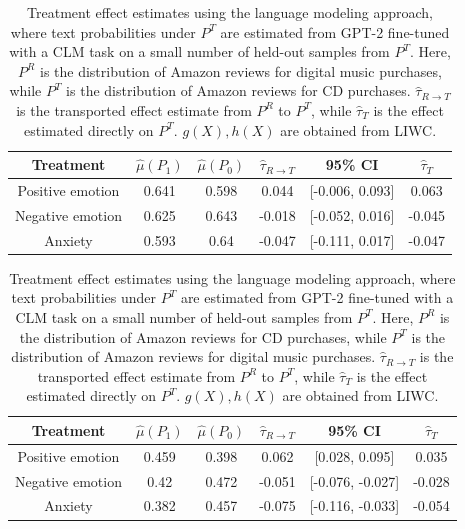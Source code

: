 \documentclass{article}
\begin{document}
\begin{table}[!ht]
    \centering
    \begin{tabular}{c|ccccc}
    \toprule
    Treatment & $\hat{\mu}(P_1)$ & $\hat{\mu}(P_0)$ & $\hat{\tau}_{R \rightarrow T}$ & 95\% CI & $\hat{\tau}_T$ \\
    \midrule
    Positive emotion & 0.641 & 0.598 &  0.044 & [-0.006, 0.093] & 0.063 \\
    Negative emotion & 0.625 & 0.643 & -0.018 & [-0.052, 0.016] & -0.045 \\
    Anxiety  & 0.593 & 0.64  & -0.047 & [-0.111, 0.017] & -0.047 \\
    \bottomrule
    \end{tabular}
    \caption{Treatment effect estimates using the language modeling approach, where text probabilities under $P^T$ are estimated from GPT-2 fine-tuned with a CLM task on a small number of held-out samples from $P^T$. Here, $P^R$ is the distribution of Amazon reviews for digital music purchases, while $P^T$ is the distribution of Amazon reviews for CD purchases. $\hat{\tau}_{R \rightarrow T}$ is the transported effect estimate from $P^R$ to $P^T$, while $\hat{\tau}_T$ is the effect estimated directly on $P^T$. $g(X), h(X)$ are obtained from LIWC.}
    \label{tab:results_clm_gpt2_finetuned_amazon1}
\end{table}

\begin{table}[!ht]
    \centering
    \begin{tabular}{c|ccccc}
    \toprule
    Treatment & $\hat{\mu}(P_1)$ & $\hat{\mu}(P_0)$ & $\hat{\tau}_{R \rightarrow T}$ & 95\% CI & $\hat{\tau}_T$ \\
    \midrule
    Positive emotion & 0.459 & 0.398 &  0.062 & [0.028, 0.095]   &  0.035   \\
    Negative emotion & 0.42  & 0.472 & -0.051 & [-0.076, -0.027] & -0.028 \\
    Anxiety    & 0.382 & 0.457 & -0.075 & [-0.116, -0.033] &  -0.054 \\
    \bottomrule
    \end{tabular}
    \caption{Treatment effect estimates using the language modeling approach, where text probabilities under $P^T$ are estimated from GPT-2 fine-tuned with a CLM task on a small number of held-out samples from $P^T$. Here, $P^R$ is the distribution of Amazon reviews for CD purchases, while $P^T$ is the distribution of Amazon reviews for digital music purchases. $\hat{\tau}_{R \rightarrow T}$ is the transported effect estimate from $P^R$ to $P^T$, while $\hat{\tau}_T$ is the effect estimated directly on $P^T$. $g(X), h(X)$ are obtained from LIWC.}
    \label{tab:results_clm_gpt2_finetuned_amazon2}
\end{table}
\end{document}
